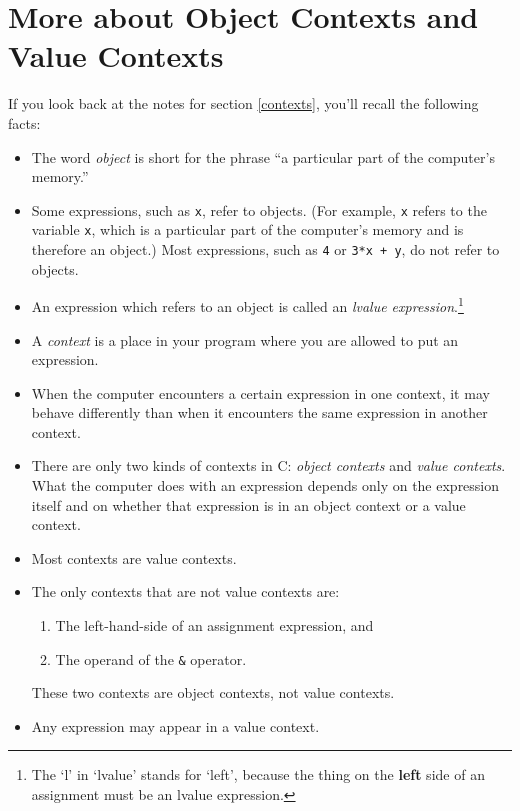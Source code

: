 %
%
%

\section{More about Object Contexts and Value Contexts}


If you look back at the notes for section \ref{contexts}, you'll recall
the following facts:

\begin{itemize}
\item The word {\em object}\/ is short for the phrase ``a particular
part of the computer's memory.''
\item Some expressions, such as {\tt x},  refer to objects.  (For
example, {\tt x} refers to the variable {\tt x}, which is a particular
part of the computer's memory and is therefore an object.)  Most
expressions, such as {\tt 4} or {\tt 3*x + y}, do not refer to objects.
\item An expression which refers to  an object is
called an {\em lvalue expression}\/.\footnote{The `l' in `lvalue' stands
for `left', because the thing on the {\bf left} side of an assignment
must be an lvalue expression.}
\item A {\em context}\/ is a place in your program where you are allowed
to put an expression.
\item When the computer encounters a certain expression in one context,
it may behave differently than when it encounters the same expression in
another context.
\item There are only two kinds of contexts in C: {\em object contexts}\/
and {\em value contexts}\/.  What the computer does with an expression
depends only on the expression itself and on whether that expression is
in an object context or a value context.
\item Most contexts are value contexts.  
\item The only contexts that are not value contexts are:
\begin{enumerate}
\item The left-hand-side of an assignment expression, and
\item The operand of the {\tt\&} operator.
\end{enumerate}
These two contexts are object contexts, not value contexts.
\item Any expression may appear in a value context.

\end{itemize}
